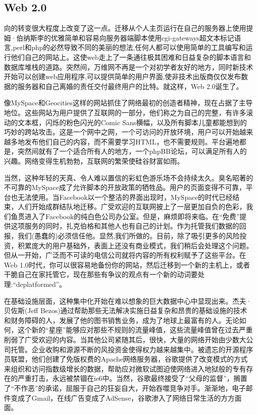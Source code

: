 \subsection{Web 2.0 \statusgreen}\label{sec:web_2}

向的转变很大程度上改变了这一点。迁移从个人主页运行在自己的服务器上使用提姆·伯纳斯李的优雅简单和容易向服务器端脚本使用cgi-gateways超文本标记语言,perl和php的必然导致不同的美丽的想法,任何人都可以使用简单的工具编写和运行他们自己的网站上。这使web走上了一条通往极其困难和日益复杂的脚本语言和数据库堆栈的道路。突然间，万维网不再是一个对初学者友好的地方，同时新技术开始可以创建web应用程序,可以提供简单的用户界面,使非技术出版商仅仅发布数据的服务器和自己离婚的责任交付最终用户的比特。就这样，Web 2.0诞生了。

像MySpace和Geocities这样的网站抓住了网络最初的创造者精神，现在占据了主导地位。这些网站为用户提供了互联网的一部分，他们称之为自己的完整，有许多滚动的文本框，闪烁的粉色闪光的Comic Sans横幅，以及所有脚本儿童都能想到的巧妙的跨站攻击。这是一个网中之网，一个可访问的开放环境，用户可以开始越来越多地发布他们自己的内容，而不需要学习HTML，也不需要规则。平台遍地都是，突然间就有了一个适合所有人的地方，一个phpBB论坛，可以满足所有人的兴趣。网络变得生机勃勃，互联网的繁荣使硅谷财富如雨。

当然，这种年轻的天真、令人难以置信的彩虹色游乐场不会持续太久。臭名昭著的不可靠的MySpace成了允许脚本的开放政策的牺牲品。用户的页面变得不可靠，平台也无法使用。当Facebook以一个整洁的界面出现时，MySpace的时代已经结束，人们开始成群结队地迁移。广受欢迎的互联网披上了一层更加自负的色彩，我们鱼贯进入了Facebook的纯白色公司办公室。但是，麻烦即将来临。在“免费”提供这项服务的同时，扎克伯格和其他人也有自己的计划。作为托管我们数据的回报，我们(愚蠢的\cite{carlson2010ims})必须信任他。显然,我们所做的。目前，除了吸引更多的风险投资，积累庞大的用户基础外，表面上还没有商业模式，我们稍后会处理这个问题。但从一开始，广泛而不可读的电信公司就将内容的所有权利赋予了这些平台。在Web 1.0时代，你可以很容易地备份你的网站，然后迁移到一个新的主机上，或者干脆自己在家托管它，现在那些有争议的观点有一个新的动词要处理:“deplatformed”。

在基础设施层面，这种集中化开始在难以想象的巨大数据中心中显现出来。杰夫·贝佐斯(Jeff Bezos)通过帮助那些无法解决实施日益复杂和昂贵的基础设施的技术和财务障碍的人，发展了他的图书销售业务，成为了地球上最富有的人。无论如何，这个新的“星座”能够应对那些不规则的流量峰值，这些流量峰值曾在过去严重削弱了广受欢迎的内容。当其他公司紧随其后，很快，大量的网络开始由少数大公司托管。企业收购和源源不断的风投资金使得权力越来越集中。被遗忘的开源程序员联盟，他们创建了免版权费的Apache网络服务器，谷歌提供了改变模式的方式来组织和访问指数级增长的数据，帮助应对微软试图迫使网络进入地狱般的专有存在的严重打击，永远被禁锢在ie6中。当然，谷歌最终接受了“父母的监督”，搁置了“不作恶”的承诺，屈服于自己的狂妄自大，开始吞噬竞争对手。渐渐地，电子邮件变成了Gmail，在线广告变成了AdSense，谷歌渗入了网络日常生活的方方面面。

